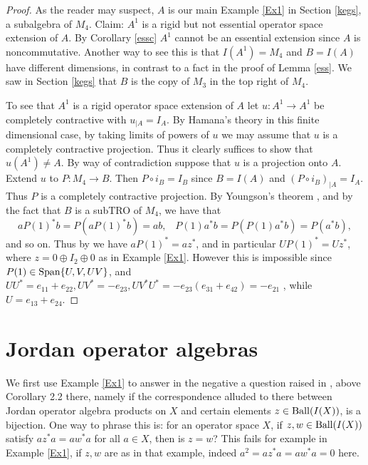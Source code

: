 \documentclass{amsart}
\theoremstyle{remark}
\theoremstyle{definition}
\numberwithin{equation}{section}
\begin{document}
  \begin{proof}  
  As the reader may suspect, $A$ is our main Example \ref{Ex1} in Section \ref{kegs}, a subalgebra of $M_4$.  Claim: $A^1$ is a rigid but not essential operator space extension of $A$.  By Corollary \ref{essc}  $A^1$ cannot be an essential extension since $A$ is noncommutative.
  Another way to see this is that $I(A^1) = M_4$ and $B = I(A)$ have different dimensions, in contrast to a fact in the proof of Lemma \ref{ess}. We saw in Section \ref{kegs} that $B$ is the copy of $M_3$ in the top right of $M_4$.
  
To see that $A^1$ is a rigid operator space extension of $A$ let $u : A^1 \to A^1$ be completely contractive with $u_{|A} = I_A$.
By Hamana's theory in this finite dimensional case, by taking limits of powers of $u$ we may assume that $u$ is a completely contractive projection.   Thus it clearly suffices to show that  $u(A^1) \neq A$.
By way of contradiction suppose that $u$ is a projection onto $A$. 
Extend $u$ to $P : M_4 \to B$.   Then $P  \circ i_B = I_B$ since $B = I(A)$ and $(P  \circ i_B)_{|A} = I_A$.
Thus $P$ is a completely contractive projection.  By Youngson's theorem \cite[Theorem 4.4.9]{BLM}, and  by  the fact that $B$ is a subTRO of $M_4$, we have that 
$$a P(1)^* b = P(a P(1)^* b) = ab,  \; \; \; P(1) a^* b = P(P(1) a^* b) = P(a^*b),$$ and so on.    Thus by 
\cite[Proposition 4.4.12]{BLM}   we have
$a P(1)^* = a z^*$, and in particular $U P(1)^* = U z^*$, where $z = 0 \oplus I_2 \oplus 0$
as in Example \ref{Ex1}.  However this is impossible since
$P(1) \in {\rm Span} \{ U,V,UV \}$, and $U U^* = e_{11} + e_{22}, UV^* = -e_{23}, UV^* U^* = - e_{23}(e_{31} + e_{42}) = - e_{21}$ , while 
$U = e_{13} +  e_{24}$. 
\end{proof} 






\section{Jordan operator algebras} \label{joa}   We first use 
Example \ref{Ex1} to answer in the negative a question raised in \cite{BNjmn}, above Corollary 2.2 there, namely if the correspondence alluded to there between Jordan operator algebra products on $X$ and certain elements $z \in {\rm Ball}(I(X))$,  is a bijection.   One way to phrase this is: for an operator space $X$, if $z, w \in {\rm Ball}(I(X))$ satisfy 
$a z^* a = a w^* a$ for all $a \in X$, then is $z = w$?     This fails 
for example in Example \ref{Ex1}, if $z, w$ are as in that example, indeed $a^2 = a z^* a = a w^* a = 0$ here. 
\end{document}
